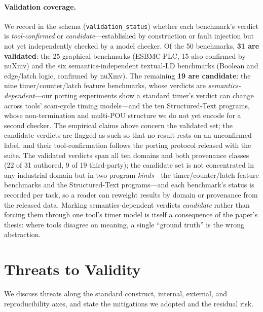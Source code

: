 \paragraph{Validation coverage.}
We record in the schema (\texttt{validation\_status}) whether each benchmark's verdict is
\emph{tool-confirmed} or \emph{candidate}---established by construction or fault injection but
not yet independently checked by a model checker. Of the 50 benchmarks, \textbf{31 are
validated}: the 25 graphical benchmarks (ESBMC-PLC, 15 also confirmed by nuXmv) and the six
semantics-independent textual-LD benchmarks (Boolean and edge/latch logic, confirmed by nuXmv).
The remaining \textbf{19 are candidate}: the nine timer/counter/latch feature benchmarks, whose
verdicts are \emph{semantics-dependent}---our porting experiments show a standard timer's verdict
can change across tools' scan-cycle timing models---and the ten Structured-Text programs, whose
non-termination and multi-POU structure we do not yet encode for a second checker. The empirical
claims above concern the validated set; the candidate verdicts are flagged as such so that no
result rests on an unconfirmed label, and their tool-confirmation follows the porting protocol
released with the suite. The validated verdicts span all ten domains and both provenance classes
(22 of 31 authored, 9 of 19 third-party); the candidate set is not concentrated in any industrial
domain but in two program \emph{kinds}---the timer/counter/latch feature benchmarks and the
Structured-Text programs---and each benchmark's status is recorded per task, so a reader can
reweight results by domain or provenance from the released data. Marking semantics-dependent
verdicts \emph{candidate} rather than
forcing them through one tool's timer model is itself a consequence of the paper's thesis: where
tools disagree on meaning, a single ``ground truth'' is the wrong abstraction.

\section{Threats to Validity}
\label{sec:threats}

We discuss threats along the standard construct, internal, external, and
reproducibility axes, and state the mitigations we adopted and the residual risk.

